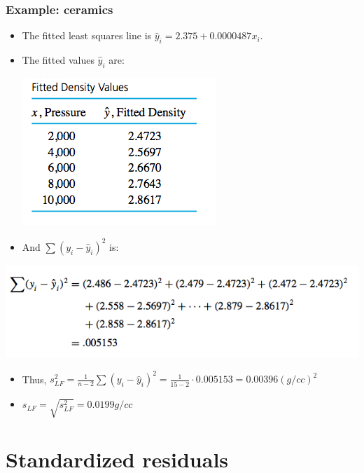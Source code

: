\documentclass[handout]{beamer}\usepackage[]{graphicx}\usepackage[]{color}
\providecommand{\wh}[1]{\widehat{#1}}
\numberwithin{equation}{section}
\begin{document}
\begin{frame}
\frametitle{Example: ceramics} \scriptsize
\begin{itemize}
\item The fitted least squares line is $\wh{y}_i = 2.375 + 0.0000487 x_i$.
\pause \item The fitted values $\wh{y}_i$ are:
\begin{center}
 \includegraphics{../../fig/ceramicsfit.png}
\end{center}
\pause \item And $\sum (y_i - \wh{y}_i)^2$ is:
\end{itemize}
\begin{center}
 \includegraphics{../../fig/ceramicsyyhat.png}
\end{center}
\begin{itemize}
\pause \item Thus, $s^2_{LF} = \frac{1}{n-2} \sum (y_i - \wh{y}_i)^2 = \frac{1}{15 - 2} \cdot 0.005153 = 0.00396 (g/cc)^2$
\pause \item $s_{LF} = \sqrt{s^2_{LF}} = 0.0199 g/cc$
\end{itemize}
\end{frame}

\section{Standardized residuals}
\end{document}
